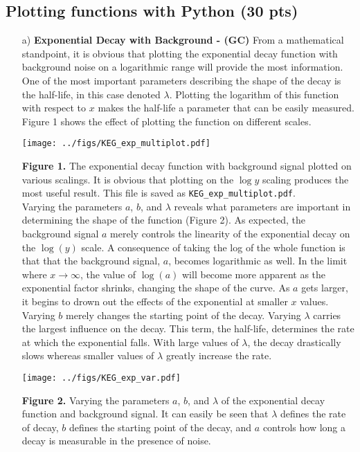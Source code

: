 \subsection{Plotting functions with Python (30 pts)}
\begin{itemize}
	\item[a)]\textbf{Exponential Decay with Background - (GC)} From a
		mathematical standpoint, it is obvious that plotting the
		exponential decay function with background noise on a
		logarithmic range will provide the most information. One of
		the most important parameters describing the shape of the
		decay is the half-life, in this case denoted $\lambda$.
		Plotting the logarithm of this function with respect to $x$
		makes the half-life a parameter that can be easily measured.
		Figure 1 shows the effect of plotting the function on
		different scales.	
		\begin{center}
			\texttt{[image: ../figs/KEG\_exp\_multiplot.pdf]}
		\end{center}
		{\small \textbf{Figure 1.} The exponential decay function with
		background signal plotted on various scalings. It is
		obvious that plotting on the $\log y$ scaling produces the
		most useful result. This file is saved as
		\texttt{KEG\_exp\_multiplot.pdf}.}\\

		Varying the parameters $a$, $b$, and $\lambda$ reveals what
		parameters are important in determining the shape of the
		function (Figure 2). As expected, the background signal $a$
		merely controls the linearity of the exponential decay on the
		$\log(y)$ scale. A consequence of
		taking the log of the whole function is that that the
		background signal, $a$, becomes logarithmic as well.  In the
		limit where $x \rightarrow \infty$, the value of $\log(a)$
		will become more apparent as the exponential factor shrinks,
		changing the shape of the curve.  As $a$ gets larger, it
		begins to drown out the effects of the exponential at smaller
		$x$ values. Varying $b$ merely changes the starting point of
		the decay. Varying $\lambda$ carries the largest influence on
		the decay. This term, the half-life, determines the rate at
		which the exponential falls. With large values of $\lambda$,
		the decay drastically slows whereas smaller values of
		$\lambda$ greatly increase the rate.

		\begin{center}
			\texttt{[image: ../figs/KEG\_exp\_var.pdf]}
		\end{center}
		{\small \textbf{Figure 2.} Varying the parameters $a$, $b$,
		and $\lambda$ of the exponential decay function and background
		signal. It can easily be seen that $\lambda$ defines the rate
		of decay, $b$ defines the starting point of the decay, and $a$
		controls how long a decay is measurable in the presence of
	noise.}
		

\end{itemize}
